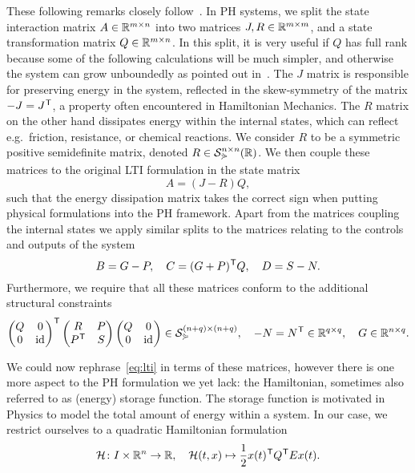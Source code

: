 These following remarks closely follow~\cite[Definition~4.9]{Mehrmann2023}.
In \ac{PH} systems, we split the state interaction matrix $A \in \mathbb{R}^{m \times n}$ into two matrices $J, R \in \mathbb{R}^{m \times m}$, and a state transformation matrix $Q \in \mathbb{R}^{m \times n}$.
In this split, it is very useful if $Q$ has full rank because some of the following calculations will be much simpler, and otherwise the system can grow unboundedly as pointed out in~\cite[Remark~4.10]{Mehrmann2023}.
The $J$ matrix is responsible for preserving energy in the system, reflected in the skew-symmetry of the matrix $-J = J^{\mkern1mu \mathsf{T}}$, a property often encountered in Hamiltonian Mechanics.
The $R$ matrix on the other hand dissipates energy within the internal states, which can reflect e.g.\ friction, resistance, or chemical reactions.
We consider $R$ to be a symmetric positive semidefinite matrix, denoted $R \in \mathcal{S}_{\curlyeqsucc}^{n \times n}(\mathbb{R})$.
We then couple these matrices to the original \ac{LTI} formulation in the state matrix
\begin{equation*}
    A = (J - R)Q,
\end{equation*}
such that the energy dissipation matrix takes the correct sign when putting physical formulations into the \ac{PH} framework.
Apart from the matrices coupling the internal states we apply similar splits to the matrices relating to the controls and outputs of the system
\begin{equation*}
    B = G - P,\quad C = (G + P)^{\mkern1mu \mathsf{T}} Q,\quad D = S - N.
\end{equation*}
Furthermore, we require that all these matrices conform to the additional structural constraints
\begin{equation*}
    \begin{pmatrix}
        Q & 0 \\
        0 & \text{id}_{}
    \end{pmatrix}^{\mkern1mu \mathsf{T}}
    \begin{pmatrix}
        R & P \\
        P^{\mkern1mu \mathsf{T}} & S
    \end{pmatrix}
    \begin{pmatrix}
        Q & 0 \\
        0 & \text{id}_{}
    \end{pmatrix}
    \in \mathcal{S}_{\curlyeqsucc}^{(n + q) \times (n + q)},\quad -N = N^{\mkern1mu \mathsf{T}} \in \mathbb{R}^{q \times q},\quad G \in \mathbb{R}^{n \times q}.
\end{equation*}

We could now rephrase~\eqref{eq:lti} in terms of these matrices, however there is one more aspect to the \ac{PH} formulation we yet lack: the Hamiltonian, sometimes also referred to as (energy) storage function.
The storage function is motivated in Physics to model the total amount of energy within a system.
In our case, we restrict ourselves to a quadratic Hamiltonian formulation
\begin{equation}\label{eq:quadratic-hamiltonian}
    \mathcal{H} \colon I \times \mathbb{R}^{n} \to \mathbb{R},\quad \mathcal{H}(t, x) \mapsto \frac{1}{2} x(t)^{\mkern1mu \mathsf{T}} Q^{\mkern1mu \mathsf{T}} E x(t).
\end{equation}

